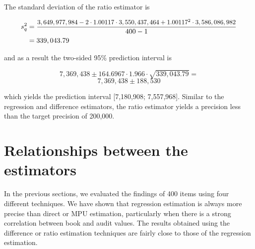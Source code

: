 The standard deviation of the ratio estimator is

\begin{align*}
s_q^2
&=
\frac{\scalebox{0.92}{$
3,649,977,984
-2\cdot1.00117\cdot3,550,437,464
+1.00117^2\cdot3,586,086,982
$}}{400-1} \\
&= 339,043.79
\end{align*}

and as a result the two-sided 95\% prediction interval is

\begin{equation*}
7,369,438 \pm 164.6967 \cdot 1.966 \cdot \sqrt{339,043.79} = 
\end{equation*}
\begin{equation*}
  7,369,438 \pm 188,530
\end{equation*}

which yields the prediction interval [7,180,908; 7,557,968]. Similar to the regression and difference estimators, the ratio estimator yields a precision less than the target precision of 200,000.



\section{Relationships between the estimators} %
\label{sec:relationships_between_the_estimators}

In the previous sections, we evaluated the findings of 400 items using four different techniques. We have shown that regression estimation is always more precise than direct or MPU estimation, particularly when there is a strong correlation between book and audit values. The results obtained using the difference or ratio estimation techniques are fairly close to those of the regression estimation. 

